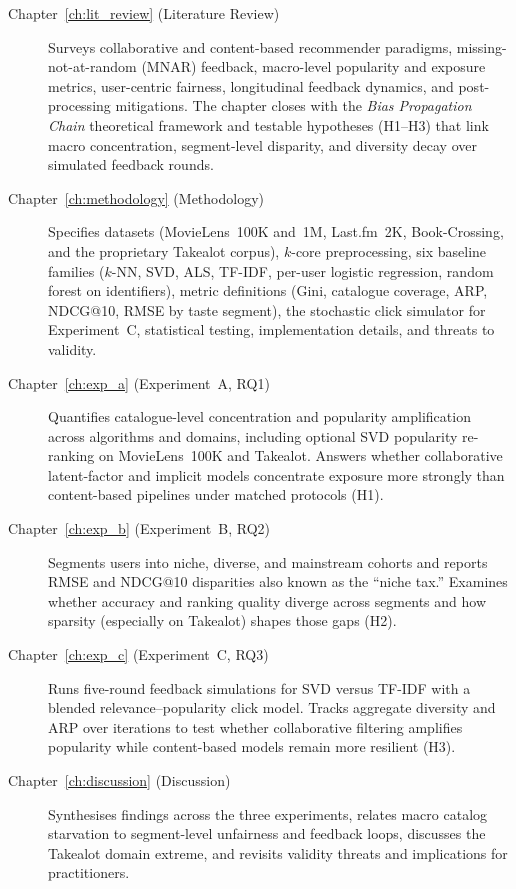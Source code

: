\documentclass[11pt,a4paper]{report}
\begin{document}
\begin{description}
  \item[Chapter~\ref{ch:lit_review} (Literature Review)]
  Surveys collaborative and content-based recommender paradigms, missing-not-at-random (MNAR) feedback, macro-level popularity and exposure metrics, user-centric fairness, longitudinal feedback dynamics, and post-processing mitigations. The chapter closes with the \emph{Bias Propagation Chain} theoretical framework and testable hypotheses (H1--H3) that link macro concentration, segment-level disparity, and diversity decay over simulated feedback rounds.

  \item[Chapter~\ref{ch:methodology} (Methodology)]
  Specifies datasets (MovieLens~100K and~1M, Last.fm~2K, Book-Crossing, and the proprietary Takealot corpus), $k$-core preprocessing, six baseline families ($k$-NN, SVD, ALS, TF-IDF, per-user logistic regression, random forest on identifiers), metric definitions (Gini, catalogue coverage, ARP, NDCG@10, RMSE by taste segment), the stochastic click simulator for Experiment~C, statistical testing, implementation details, and threats to validity.

  \item[Chapter~\ref{ch:exp_a} (Experiment~A, RQ1)]
  Quantifies catalogue-level concentration and popularity amplification across algorithms and domains, including optional SVD popularity re-ranking on MovieLens~100K and Takealot. Answers whether collaborative latent-factor and implicit models concentrate exposure more strongly than content-based pipelines under matched protocols (H1).

  \item[Chapter~\ref{ch:exp_b} (Experiment~B, RQ2)]
  Segments users into niche, diverse, and mainstream cohorts and reports RMSE and NDCG@10 disparities also known as the ``niche tax.'' Examines whether accuracy and ranking quality diverge across segments and how sparsity (especially on Takealot) shapes those gaps (H2).

  \item[Chapter~\ref{ch:exp_c} (Experiment~C, RQ3)]
  Runs five-round feedback simulations for SVD versus TF-IDF with a blended relevance--popularity click model. Tracks aggregate diversity and ARP over iterations to test whether collaborative filtering amplifies popularity while content-based models remain more resilient (H3).

  \item[Chapter~\ref{ch:discussion} (Discussion)]
  Synthesises findings across the three experiments, relates macro catalog starvation to segment-level unfairness and feedback loops, discusses the Takealot domain extreme, and revisits validity threats and implications for practitioners.


\end{description}
\end{document}
